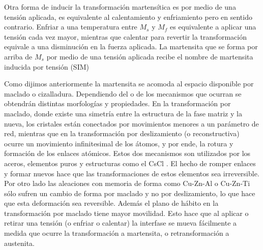 \documentclass[a4paper,12pt,fleqn,twoside,openany]{book}
\begin{document}

Otra forma de inducir la transformación martensítica es por medio de una tensión aplicada, es equivalente al calentamiento y enfriamiento pero en 
sentido contrario. Enfriar a una temperatura entre $M_{s}$ y $M_{f}$ es equivalente a aplicar una tensión cada vez mayor, mientras que calentar para revertir la 
transformación equivale a una disminución en la fuerza aplicada. La martensita que se forma por arriba de $M_{s}$ por medio de una 
tensión aplicada recibe el nombre de martensita inducida por tensión (SIM)
  


Como dijimos anteriormente la martensita se acomoda al espacio disponible por maclado o cizalladura. Dependiendo del o de los mecanismos que ocurran se obtendrán 
distintas morfologías y propiedades. En la transformación por maclado, donde existe una simetría entre la estructura de la fase matriz y la nueva, los cristales 
están conectados por movimientos menores a un parámetro de red, mientras que en la transformación por deslizamiento (o reconstructiva) ocurre un movimiento 
infinitesimal de los átomos, y por ende, la rotura y formación de los enlaces atómicos. Estos dos mecanismos son utilizados por los aceros, 
elementos puros y estructuras como el CsCl \cite{duering, elliott}. El hecho de romper enlaces y formar nuevos hace que las transformaciones de estos 
elementos sea irreversible. Por otro lado las aleaciones con memoria de forma como Cu-Zn-Al o Cu-Zn-Ti sólo sufren un cambio de forma por maclado y no por 
deslizamiento, lo que hace que esta deformación sea reversible. Además el plano de hábito en la transformación por maclado tiene mayor movilidad. Esto hace que 
al aplicar o retirar una tensión (o enfriar o calentar) la interfase se mueva fácilmente a medida que ocurre la transformación a martensita, o retransformación 
a austenita.




\end{document}
